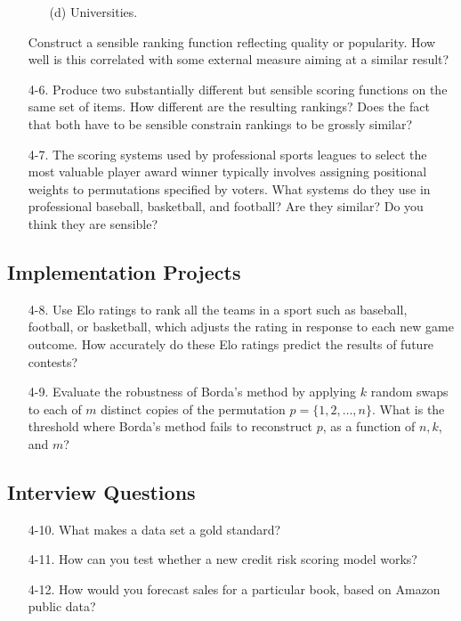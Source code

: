 \documentclass[10pt]{article}
\begin{document}
\begin{enumerate}
\begin{itemize}
        \item [(d)] Universities.
    \end{itemize}
    Construct a sensible ranking function reflecting quality or popularity. How well is this correlated with some external measure aiming at a similar result?
    \item [4-6.] Produce two substantially different but sensible scoring functions on the same set of items. How different are the resulting rankings? Does the fact that both have to be sensible constrain rankings to be grossly similar?
    \item [4-7.] The scoring systems used by professional sports leagues to select the most valuable player award winner typically involves assigning positional weights to permutations specified by voters. What systems do they use in professional baseball, basketball, and football? Are they similar? Do you think they are sensible?
\end{enumerate}

\subsection*{Implementation Projects}
\begin{enumerate}
    \item [4-8.] Use Elo ratings to rank all the teams in a sport such as baseball, football, or basketball, which adjusts the rating in response to each new game outcome. How accurately do these Elo ratings predict the results of future contests?
    \item [4-9.] Evaluate the robustness of Borda’s method by applying $k$ random swaps to each of $m$ distinct copies of the permutation $p=\{1,2, \ldots, n\}$. What is the threshold where Borda’s method fails to reconstruct $p$, as a function of $n, k$, and $m$?
\end{enumerate}

\subsection*{Interview Questions}
\begin{enumerate}
    \item [4-10.] What makes a data set a gold standard?
    \item [4-11.] How can you test whether a new credit risk scoring model works?
    \item [4-12.] How would you forecast sales for a particular book, based on Amazon public data?
\end{enumerate}
\end{document}
